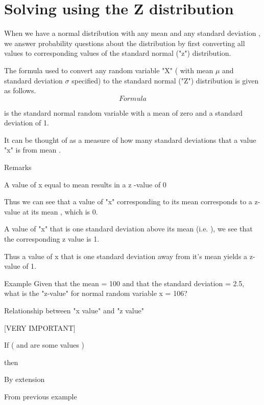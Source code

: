 \documentclass[]{report}
\begin{document}
	
	
	
	
	
	
	
	
	\section{Solving using the Z distribution}
	When we have a normal distribution with any mean   and any standard deviation  , we answer probability questions about the distribution by first converting all values to corresponding values of the standard normal ("z") distribution. 
	
	The formula used to convert any random variable "X" ( with mean $\mu$  and standard deviation $\sigma$  specified)  to the standard normal ("Z") distribution is given as follows. 
	\[Formula\]
	
	is the standard normal random variable with a mean of zero and a standard deviation of 1. 
	
	It can be thought of as a measure of how many standard deviations that a value "x" is from mean  .
	
	
	
	Remarks
	
	A value of x equal to mean   results in a z -value of 0
	
	
	Thus we can see that a value of "x" corresponding to its mean    corresponds to a z-value at its mean , which is 0.
	
	A value of "x" that is one standard deviation above its mean (i.e.  ), we see that the corresponding z value is 1.
	
	
	Thus a value of x that is one standard deviation away from it's mean yields a z-value of 1.
	
	
	
	Example
	Given that the mean   = 100 and that the standard deviation    = 2.5, what is the "z-value" for normal random variable x = 106?
	
	
	
	Relationship between "x value" and "z  value"
	
	[VERY IMPORTANT]
	
	If    (   and   are some values )
	
	then  
	
	
	By extension  
	
	
	From previous example 
	
\end{document}
